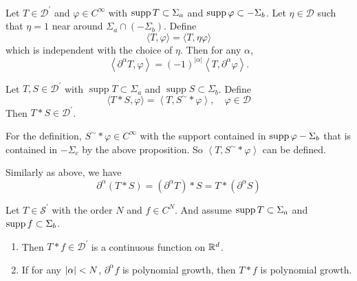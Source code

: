 \begin{enumerate}
	\begin{prop}
		Let $T \in \mathcal{D}^\prime$ and $\varphi \in C^\infty$ with $\operatorname{supp} T \subset \Sigma_a$ and $\operatorname{supp} \varphi \subset -\Sigma_b$. Let $\eta \in \mathcal{D}$ such that $\eta = 1$ near around $\Sigma_a \cap\left(-\Sigma_b\right)$. Define
		\begin{equation*}
			\langle T, \varphi\rangle=\langle T, \eta \varphi\rangle
		\end{equation*}
		which is independent with the choice of $\eta$. Then for any $\alpha$,
		\begin{equation*}
			\left\langle\partial^\alpha T, \varphi\right\rangle=(-1)^{|\alpha|}\left\langle T, \partial^\alpha \varphi\right\rangle .
		\end{equation*}
	\end{prop}

	\begin{prop}
		Let $T,S \in \mathcal{D}^\prime$ with $\operatorname{supp} T \subset \Sigma_a$ and $\operatorname{supp} S \subset \Sigma_b$. Define
		\begin{equation*}
			\langle T * S, \varphi\rangle=\left\langle T, S^{\sim} * \varphi\right\rangle, \quad \varphi \in \mathcal{D}
		\end{equation*}
		Then $T * S \in \mathcal{D}^\prime$. 
	\end{prop}
	\begin{rmk}
		For the definition, $S^\sim * \varphi \in C^\infty$ with the support contained in $\operatorname{supp} \varphi - \Sigma_b$ that is contained in $-\Sigma_c$ by the above proposition. So $\left\langle T, S^{\sim} * \varphi\right\rangle$ can be defined.
	\end{rmk}
	\noindent Similarly as above, we have
	\begin{equation*}
		\partial^\alpha(T * S)=\left(\partial^\alpha T\right) * S=T *\left(\partial^\alpha S\right)
	\end{equation*}

	\begin{prop}
		Let $T \in \mathcal{S}^\prime$ with the order $N$ and $f \in C^N$. And assume $\operatorname{supp} T \subset \Sigma_a$ and $\operatorname{supp} f \subset \Sigma_b$. 
		\begin{enumerate}
			\item Then $T * f \in \mathcal{D}^\prime$ is a continuous function on $\mathbb{R}^d$.

			\item If for any $\left\lvert\alpha\right\lvert < N$, $\partial^\alpha f$ is polynomial growth, then $T*f$ is polynomial growth.
		\end{enumerate}
	\end{prop}


\end{enumerate}
